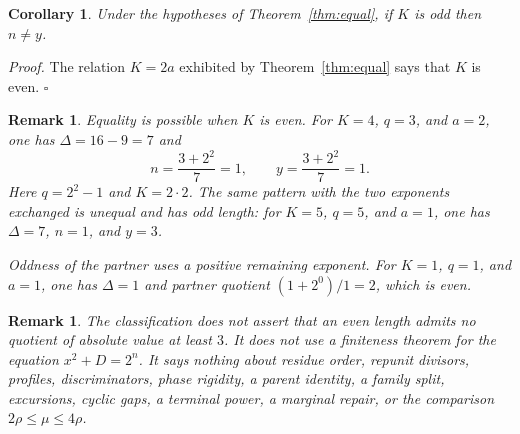 \documentclass[11pt,letterpaper]{article}
\newtheorem{corollary}[theorem]{Corollary}
\newtheorem{remark}[theorem]{Remark}
\newenvironment{proof}{\noindent\textit{Proof.}}{\hfill\(\square\)}
\begin{document}
\begin{corollary}
\label{cor:odd-k}
Under the hypotheses of Theorem~\ref{thm:equal}, if \(K\) is odd then \(n\neq y\).
\end{corollary}

\begin{proof}
The relation \(K=2a\) exhibited by Theorem~\ref{thm:equal} says that \(K\) is even.
\end{proof}

\begin{remark}
Equality is possible when \(K\) is even. For \(K=4\), \(q=3\), and \(a=2\), one has \(\Delta=16-9=7\) and
\[
n=\frac{3+2^{2}}{7}=1,\qquad y=\frac{3+2^{2}}{7}=1.
\]
Here \(q=2^{2}-1\) and \(K=2\cdot 2\). The same pattern with the two exponents exchanged is unequal and has odd length: for \(K=5\), \(q=5\), and \(a=1\), one has \(\Delta=7\), \(n=1\), and \(y=3\).

Oddness of the partner uses a positive remaining exponent. For \(K=1\), \(q=1\), and \(a=1\), one has \(\Delta=1\) and partner quotient \((1+2^{0})/1=2\), which is even.
\end{remark}

\begin{remark}
The classification does not assert that an even length admits no quotient of absolute value at least \(3\). It does not use a finiteness theorem for the equation \(x^{2}+D=2^{n}\). It says nothing about residue order, repunit divisors, profiles, discriminators, phase rigidity, a parent identity, a family split, excursions, cyclic gaps, a terminal power, a marginal repair, or the comparison \(2\rho\le\mu\le 4\rho\).
\end{remark}
\end{document}
